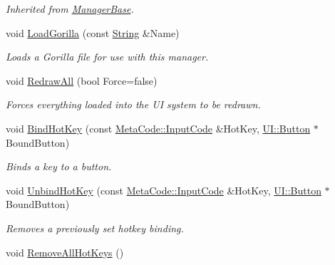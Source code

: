 \begin{DoxyCompactItemize}
\begin{DoxyCompactList}\small\item\em Inherited from \hyperlink{classphys_1_1ManagerBase}{ManagerBase}. \item\end{DoxyCompactList}\item 
void \hyperlink{classphys_1_1UIManager_afda4422105d6ab353fd40410adffbc0a}{LoadGorilla} (const \hyperlink{namespacephys_aa03900411993de7fbfec4789bc1d392e}{String} \&Name)
\begin{DoxyCompactList}\small\item\em Loads a Gorilla file for use with this manager. \item\end{DoxyCompactList}\item 
void \hyperlink{classphys_1_1UIManager_a4a4ce18dc4f32f8274a50fb4b99b87e3}{RedrawAll} (bool Force=false)
\begin{DoxyCompactList}\small\item\em Forces everything loaded into the UI system to be redrawn. \item\end{DoxyCompactList}\item 
void \hyperlink{classphys_1_1UIManager_a935d79d7b2ba71075c330e6bc0c7391c}{BindHotKey} (const \hyperlink{classphys_1_1MetaCode_a3e501cbb5bf0f6f1fdb7211465bda8d8}{MetaCode::InputCode} \&HotKey, \hyperlink{classphys_1_1UI_1_1Button}{UI::Button} $\ast$BoundButton)
\begin{DoxyCompactList}\small\item\em Binds a key to a button. \item\end{DoxyCompactList}\item 
void \hyperlink{classphys_1_1UIManager_a9d79615c0c9f9895dd10ac0399aa6e81}{UnbindHotKey} (const \hyperlink{classphys_1_1MetaCode_a3e501cbb5bf0f6f1fdb7211465bda8d8}{MetaCode::InputCode} \&HotKey, \hyperlink{classphys_1_1UI_1_1Button}{UI::Button} $\ast$BoundButton)
\begin{DoxyCompactList}\small\item\em Removes a previously set hotkey binding. \item\end{DoxyCompactList}\item 
\hypertarget{classphys_1_1UIManager_ac09c26ff3d5bade09f0480d5702d2042}{
void \hyperlink{classphys_1_1UIManager_ac09c26ff3d5bade09f0480d5702d2042}{RemoveAllHotKeys} ()}
\label{d5/dc5/classphys_1_1UIManager_ac09c26ff3d5bade09f0480d5702d2042}


\end{DoxyCompactItemize}
